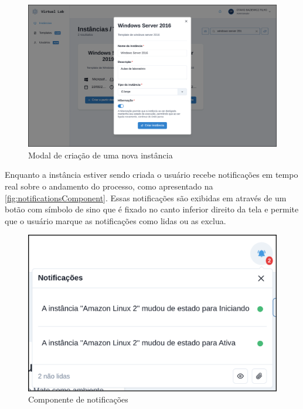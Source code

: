 \begin{figure}[H]
\caption{Modal de criação de uma nova instância}
\label{fig:createInstance}
\includegraphics[width=\textwidth]{capitulos/3-resultados/files/create-instance.png}
\end{figure}

Enquanto a instância estiver sendo criada o usuário recebe notificações em tempo real sobre o andamento do processo, como apresentado na \autoref{fig:notificationsComponent}. Essas notificações são exibidas em através de um botão com símbolo de sino que é fixado no canto inferior direito da tela e permite que o usuário marque as notificações como lidas ou as exclua.

\begin{figure}[H]
\caption{Componente de notificações}
\label{fig:notificationsComponent}
\includegraphics[width=\textwidth]{capitulos/3-resultados/files/notifications.png}
\end{figure}

